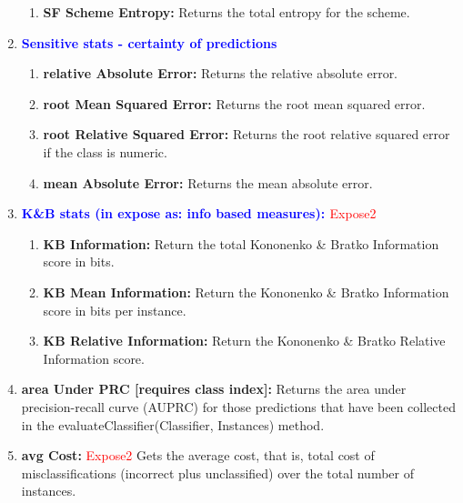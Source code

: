 \documentclass[a4paper,12pt, english]{article}
\begin{document}
\begin{enumerate}
\begin{enumerate}
\item \textbf{SF Scheme Entropy: }
          Returns the total entropy for the scheme. 

\end{enumerate}



\item \textbf{\textcolor{blue}{Sensitive stats - certainty of predictions}}
\begin{enumerate}

\item \textbf{relative Absolute Error: }
          Returns the relative absolute error. 

\item \textbf{root Mean Squared Error: }
          Returns the root mean squared error.           

\item \textbf{root Relative Squared Error: }
          Returns the root relative squared error if the class is numeric. 
                    
\item \textbf{mean Absolute Error: }
          Returns the mean absolute error. 
\end{enumerate}    

\item  \textbf{\textcolor{blue}{K\&B stats (in expose as: info based measures): }} \textcolor{red}{Expose2}
\begin{enumerate}          
\item \textbf{KB Information: } 
          Return the total Kononenko \& Bratko Information score in bits. 
          
\item \textbf{KB Mean Information: }
          Return the Kononenko \& Bratko Information score in bits per instance. 
          
\item \textbf{KB Relative Information: }
          Return the Kononenko \& Bratko Relative Information score.
\end{enumerate}


\item \textbf{area Under PRC [requires class index]: }
          Returns the area under precision-recall curve (AUPRC) for those predictions that have been collected in the evaluateClassifier(Classifier, Instances) method.
          


\item \textbf{avg Cost: } \textcolor{red}{Expose2}
          Gets the average cost, that is, total cost of misclassifications (incorrect plus unclassified) over the total number of instances.


\end{enumerate}
\end{document}
